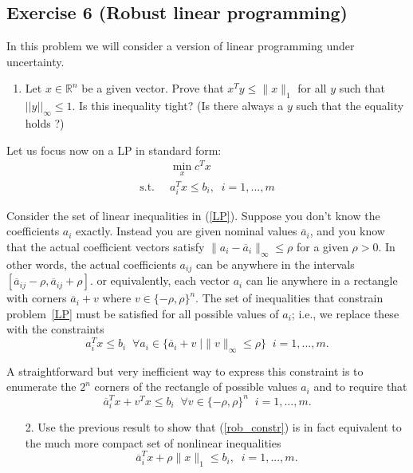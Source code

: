\documentclass[11pt]{article}
\begin{document}
\newpage
\subsection*{Exercise 6 (Robust linear programming)}

In this problem we will consider a version of linear programming under uncertainty.
\begin{enumerate}
    \item Let $x \in \mathbb{R}^n$ be a given vector. Prove that $x^Ty \leq \|x\|_1$ for all $y$ such that $||y||_{\infty} \leq 1$. Is this inequality tight? (Is there always a $y$ such that the equality holds ?)
\end{enumerate}

Let us focus now on a LP in standard form:
\begin{align}
    &\min_x c^Tx \nonumber \\
    \label{LP}
    \text{s.t.} \; \; &a_i^Tx \leq b_i, \; \; i = 1,...,m
\end{align}

Consider the set of linear inequalities in (\ref{LP}). Suppose you don't know the coefficients $a_i$ exactly. Instead you are given nominal values $\overline{a}_i$, and you know that the actual coefficient vectors satisfy $\|a_i - \overline{a}_i\|_{\infty} \leq \rho $ for a given $\rho > 0$. In other words, the actual coefficients $a_{ij}$ can be anywhere in the intervals $[\overline{a}_{ij} - \rho, \overline{a}_{ij} + \rho]$.  or equivalently, each vector $a_i$ can lie anywhere in a rectangle with corners $\overline{a}_i + v$ where $v \in \{-\rho, \rho\}^n$. The set of inequalities that constrain problem~\ref{LP} must be satisfied for all possible values of $a_i$; i.e., we replace these with the constraints
    \begin{equation}
    \label{rob_constr}
           a_i^Tx \leq b_i \; \; \forall a_i \in \{\overline{a}_i + v \; \mid \|v\|_{\infty} \leq \rho \} \; \;  i = 1, ..., m.
    \end{equation}

    A straightforward but very inefficient way to express this constraint is to enumerate the $2^n$ corners of the rectangle of possible values $a_i$ and to require that
    \[
    \overline{a}_i^Tx + v^Tx \leq b_i \; \; \forall v \in \{-\rho, \rho\}^n \; \; i = 1, ..., m.
    \]

    \begin{enumerate}
    \item[2.]
    Use the previous result to show that (\ref{rob_constr}) is in fact equivalent to the much more compact set of nonlinear inequalities
    \[
        \overline{a}_i^Tx + \rho\|x\|_1 \leq b_i, \; \; i = 1,...,m.
    \]

    \end{enumerate}
\end{document}
